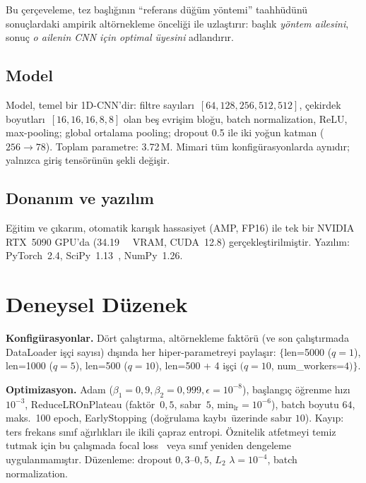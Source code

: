 \documentclass[conference]{IEEEtran}
\begin{document}
Bu \c{c}er\c{c}eveleme, tez ba\c{s}l\i \u{g}\i n\i n ``referans d\"{u}\u{g}\"{u}m
y\"{o}ntemi'' taahh\"{u}d\"{u}n\"{u} sonu\c{c}lardaki ampirik alt\"{o}rnekleme
\"{o}nceli\u{g}i ile uzla\c{s}t\i r\i r: ba\c{s}l\i k \emph{y\"{o}ntem ailesini},
sonu\c{c} \emph{o ailenin CNN i\c{c}in optimal \"{u}yesini} adland\i r\i r.

\subsection{Model}
Model, temel bir 1D-CNN'dir: filtre say\i lar\i\ $[64,128,256,512,512]$,
\c{c}ekirdek boyutlar\i\ $[16,16,16,8,8]$ olan be\c{s} evri\c{s}im blo\u{g}u,
batch normalization, ReLU, max-pooling; global ortalama pooling; dropout
\num{0,5} ile iki yo\u{g}un katman ($256\!\rightarrow\!\num{78}$). Toplam
parametre: \num{3,72}\,M. Mimari t\"{u}m konfig\"{u}rasyonlarda ayn\i d\i r;
yaln\i zca giri\c{s} tens\"{o}r\"{u}n\"{u}n \c{s}ekli de\u{g}i\c{s}ir.

\subsection{Donan\i m ve yaz\i l\i m}
E\u{g}itim ve \c{c}\i kar\i m, otomatik kar\i\c{s}\i k hassasiyet (AMP, FP16)
ile tek bir NVIDIA RTX~5090 GPU'da (\SI{34,19}{\gibi\byte} VRAM,
CUDA~12.8) ger\c{c}ekle\c{s}tirilmi\c{s}tir. Yaz\i l\i m: PyTorch~2.4,
SciPy~1.13~\cite{scipy2020}, NumPy~1.26.

\section{Deneysel D\"{u}zenek}
\label{sec:setup}
\textbf{Konfig\"{u}rasyonlar.} D\"{o}rt \c{c}al\i\c{s}t\i rma, alt\"{o}rnekleme
fakt\"{o}r\"{u} (ve son \c{c}al\i\c{s}t\i rmada DataLoader i\c{s}\c{c}i say\i s\i)
d\i\c{s}\i nda her hiper-parametreyi payla\c{s}\i r:
$\{$len=\num{5000} ($q=1$), len=\num{1000} ($q=5$), len=\num{500}
($q=10$), len=\num{500} + \num{4} i\c{s}\c{c}i $(q=10$, num\_workers=$4)\}$.

\textbf{Optimizasyon.} Adam ($\beta_1=0,9, \beta_2=0,999, \epsilon=10^{-8}$),
ba\c{s}lang\i\c{c} \"{o}\u{g}renme h\i z\i\ $10^{-3}$, ReduceLROnPlateau
(fakt\"{o}r~$0,5$, sab\i r~$5$, min$_{\text{lr}}=10^{-6}$), batch boyutu
$64$, maks.\ \num{100} epoch, EarlyStopping (do\u{g}rulama kayb\i\
\"{u}zerinde sab\i r $10$). Kay\i p: ters frekans s\i n\i f a\u{g}\i rl\i klar\i
ile ikili \c{c}apraz entropi. \"{O}znitelik atfetmeyi temiz tutmak i\c{c}in bu
\c{c}al\i\c{s}mada focal loss~\cite{lin2017} veya s\i n\i f yeniden dengeleme
uygulanmam\i\c{s}t\i r. D\"{u}zenleme: dropout $0,3$--$0,5$, $L_2$
$\lambda=10^{-4}$, batch normalization.
\end{document}
